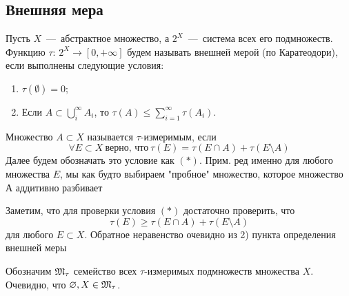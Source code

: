 \subsection{Внешняя мера}
\hypertarget{outmeasure}{}

\begin{definition}
Пусть $X$~---~абстрактное множество, а $2^X$~---~система всех его подмножеств. Функцию $\tau$: $2^X \rightarrow [0, +\infty]$ будем называть внешней мерой (по Каратеодори), если выполнены следующие условия:
\begin{enumerate}
    \item $\tau(\emptyset) = 0;$
    \item Если $A \subset \bigcup\limits_i^\infty A_i$, то $\tau(A) \leq \sum\limits_{i = 1}^\infty \tau(A_i)$.
\end{enumerate}
\end{definition}
\begin{definition}
Множество $A \subset X$ называется $\tau$-измеримым, если \[\forall E \subset X \  \text{верно, что}\  \tau(E) = \tau(E \cap A) + \tau(E \setminus A)\]
Далее будем обозначать это условие как $(*)$.
Прим. ред именно для любого множества $E$, мы как будто выбираем "пробное" множество, которое множество А аддитивно разбивает
\end{definition}

\begin{note}
Заметим, что для проверки условия $(*)$ достаточно проверить, что \[\tau(E) \geq \tau(E \cap A) + \tau(E \setminus A)\] для любого $E \subset X$. Обратное неравенство очевидно из 2) пункта определения внешней меры
\end{note}

\begin{definition}
Обозначим $\mathfrak{M}_\tau$ семейство всех $\tau$-измеримых подмножеств множества $X$. \\
Очевидно, что $\varnothing, X \in \mathfrak{M}_\tau$.
\end{definition}


